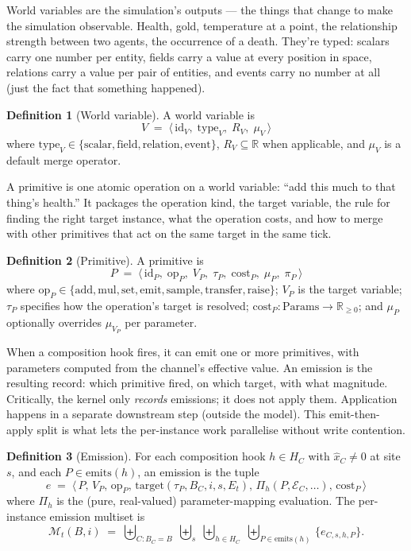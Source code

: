 \documentclass[journal,onecolumn,11pt]{IEEEtran}
\theoremstyle{definition}
\newtheorem{definition}{Definition}
\begin{document}
World variables are the simulation's outputs --- the things that change to make the simulation observable. Health, gold, temperature at a point, the relationship strength between two agents, the occurrence of a death. They're typed: scalars carry one number per entity, fields carry a value at every position in space, relations carry a value per pair of entities, and events carry no number at all (just the fact that something happened).

\begin{definition}[World variable]
A world variable is
\[
V \;=\; \langle\, \mathrm{id}_V,\; \mathrm{type}_V,\; R_V,\; \mu_V \,\rangle
\]
where $\mathrm{type}_V \in \{\mathrm{scalar},\mathrm{field},\mathrm{relation},\mathrm{event}\}$, $R_V \subseteq \mathbb{R}$ when applicable, and $\mu_V$ is a default merge operator.
\end{definition}

A primitive is one atomic operation on a world variable: ``add this much to that thing's health.'' It packages the operation kind, the target variable, the rule for finding the right target instance, what the operation costs, and how to merge with other primitives that act on the same target in the same tick.

\begin{definition}[Primitive]
A primitive is
\[
P \;=\; \langle\, \mathrm{id}_P,\; \mathrm{op}_P,\; V_P,\; \tau_P,\; \mathrm{cost}_P,\; \mu_P,\; \pi_P \,\rangle
\]
where $\mathrm{op}_P \in \{\mathrm{add},\mathrm{mul},\mathrm{set},\mathrm{emit},\mathrm{sample},\mathrm{transfer},\mathrm{raise}\}$; $V_P$ is the target variable; $\tau_P$ specifies how the operation's target is resolved; $\mathrm{cost}_P : \mathrm{Params} \to \mathbb{R}_{\ge 0}$; and $\mu_P$ optionally overrides $\mu_{V_P}$ per parameter.
\end{definition}

When a composition hook fires, it can emit one or more primitives, with parameters computed from the channel's effective value. An emission is the resulting record: which primitive fired, on which target, with what magnitude. Critically, the kernel only \emph{records} emissions; it does not apply them. Application happens in a separate downstream step (outside the model). This emit-then-apply split is what lets the per-instance work parallelise without write contention.

\begin{definition}[Emission]\label{def:emission}
For each composition hook $h \in H_C$ with $\hat{x}_C \neq 0$ at site $s$, and each $P \in \mathrm{emits}(h)$, an emission is the tuple
\[
e \;=\; \langle\, P,\, V_P,\, \mathrm{op}_P,\, \mathrm{target}(\tau_P,B_C,i,s,E_t),\, \Pi_h(P,\mathcal{E}_C,\ldots),\, \mathrm{cost}_P \,\rangle
\]
where $\Pi_h$ is the (pure, real-valued) parameter-mapping evaluation. The per-instance emission multiset is
\[
\mathcal{M}_t(B,i) \;=\; \biguplus_{C: B_C = B}\;\biguplus_s\;\biguplus_{h \in H_C}\;\biguplus_{P \in \mathrm{emits}(h)}\, \{e_{C,s,h,P}\}.
\]
\end{definition}
\end{document}
